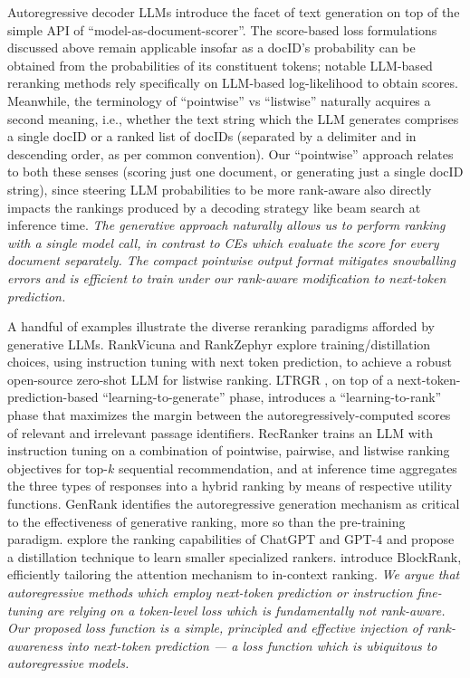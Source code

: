 \documentclass[11pt, a4paper, onecolumn, confidential, copyright, gdm]{google}
\begin{document}
Autoregressive decoder LLMs introduce the facet of text generation on top of the simple API of ``model-as-document-scorer''. The score-based loss formulations discussed above remain applicable insofar as a docID's probability can be obtained from the probabilities of its constituent tokens; notable LLM-based reranking methods \citep{sachan2022improving,drozdov2023parade} rely specifically on LLM-based log-likelihood to obtain scores. Meanwhile, the terminology of ``pointwise'' vs ``listwise'' naturally acquires a second meaning, i.e., whether the text string which the LLM generates comprises a single docID or a ranked list of docIDs (separated by a delimiter and in descending order, as per common convention). Our ``pointwise'' approach relates to both these senses (scoring just one document, or generating just a single docID string), since steering LLM probabilities to be more rank-aware also directly impacts the rankings produced by a decoding strategy like beam search at inference time. \textit{The generative approach naturally allows us to perform ranking with a single model call, in contrast to CEs which evaluate the score for every document separately. The compact pointwise output format mitigates snowballing errors and is efficient to train under our rank-aware modification to next-token prediction.}

A handful of examples illustrate the diverse reranking paradigms afforded by generative LLMs. RankVicuna \citep{pradeep2023rankvicuna} and RankZephyr \citep{pradeep2023rankzephyr} explore training/distillation choices, using instruction tuning with next token prediction, to achieve a robust open-source zero-shot LLM for listwise ranking. LTRGR \citep{li2024learning}, on top of a next-token-prediction-based ``learning-to-generate'' phase, introduces a ``learning-to-rank'' phase that maximizes the margin between the autoregressively-computed scores of relevant and irrelevant passage identifiers. RecRanker \citep{luo2024recranker} trains an LLM with instruction tuning on a combination of pointwise, pairwise, and listwise ranking objectives for top-$k$ sequential recommendation, and at inference time aggregates the three types of responses into a hybrid ranking by means of respective utility functions. GenRank \citep{huang2025towards} identifies the autoregressive generation mechanism as critical to the effectiveness of generative ranking, more so than the pre-training paradigm. \cite{sun2023chatgpt} explore the ranking capabilities of ChatGPT and GPT-4 and propose a distillation technique to learn smaller specialized rankers. \citet{gupta2025scalable} introduce BlockRank, efficiently tailoring the attention mechanism to in-context ranking. \textit{We argue that autoregressive methods which employ next-token prediction or instruction fine-tuning are relying on a token-level loss which is fundamentally not rank-aware. Our proposed loss function is a simple, principled and effective injection of rank-awareness into next-token prediction — a loss function which is ubiquitous to autoregressive models.}
\end{document}
